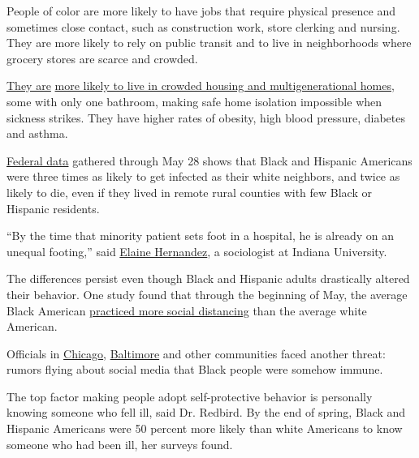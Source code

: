 People of color are more likely to have jobs that require physical
presence and sometimes close contact, such as construction work, store
clerking and nursing. They are more likely to rely on public transit and
to live in neighborhoods where grocery stores are scarce and crowded.

\href{https://www.nytimes3xbfgragh.onion/interactive/2020/07/05/us/coronavirus-latinos-african-americans-cdc-data.html}{They
are}
\href{https://www.pewresearch.org/fact-tank/2018/04/05/a-record-64-million-americans-live-in-multigenerational-households/}{more
likely to live in crowded housing and multigenerational homes}, some
with only one bathroom, making safe home isolation impossible when
sickness strikes. They have higher rates of obesity, high blood
pressure, diabetes and asthma.

\href{https://www.nytimes3xbfgragh.onion/interactive/2020/07/05/us/coronavirus-latinos-african-americans-cdc-data.html}{Federal
data} gathered through May 28 shows that Black and Hispanic Americans
were three times as likely to get infected as their white neighbors, and
twice as likely to die, even if they lived in remote rural counties with
few Black or Hispanic residents.

``By the time that minority patient sets foot in a hospital, he is
already on an unequal footing,'' said
\href{https://www.newswise.com/coronavirus/iu-professor-available-to-discuss-social-bias-and-inequality-in-covid-crisis/?article_id=729760}{Elaine
Hernandez}, a sociologist at Indiana University.

The differences persist even though Black and Hispanic adults
drastically altered their behavior. One study found that through the
beginning of May, the average Black American
\href{https://www.medrxiv.org/content/10.1101/2020.06.04.20119131v1}{practiced
more social distancing} than the average white American.

Officials in
\href{https://blockclubchicago.org/2020/04/07/black-people-are-not-immune-to-coronavirus-debunking-deadly-social-media-myths/}{Chicago},
\href{https://www.baltimoresun.com/coronavirus/bs-md-baltimore-coronavirus-black-messaging-testing-20200414-cgqbwz6cmffabel364ixfktlje-story.html}{Baltimore}
and other communities faced another threat: rumors flying about social
media that Black people were somehow immune.

The top factor making people adopt self-protective behavior is
personally knowing someone who fell ill, said Dr. Redbird. By the end of
spring, Black and Hispanic Americans were 50 percent more likely than
white Americans to know someone who had been ill, her surveys found.

